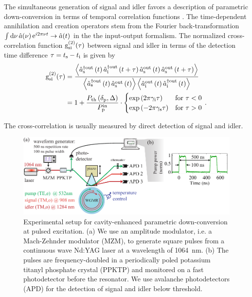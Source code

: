 \documentclass[aps,pra,showpacs,reprint,onecolumn,notitlepage]{revtex4-1}
\newcommand{\avr}[1]{\mathop{\left\langle #1 \right\rangle}\nolimits}
\newcommand{\tx}[1]{\textnormal{#1}}
\begin{document}
The simultaneous generation of signal and idler  favors a description of parametric down-conversion in terms of temporal correlation functions \cite{Fekete2013,glauber1963,Michael2013,Ou1999,Scholz2009,Bocquillon2009,Bettelli2010,Luo2015}. The time-dependent annihilation and creation operators stem from the Fourier back-transformation $\int \tx{d} \nu \, \hat{a}(\nu) \, \tx{e}^{i2 \pi \nu t} \rightarrow \hat{a}(t)$  in the the input-output formalism. The normalized cross-correlation function $\tx{g}^{(2)}_\textrm{si}(\tau)$  between signal and idler in terms of the detection time difference $\tau = t_\tx{s} - t_\tx{i}$ is given by
\begin{align}
	\tx{g}^{(2)}_\textrm{si}(\tau) &= \frac{ \avr{\hat{a}_\tx{s}^{\dagger \tx{out}} \left(t\right) \hat{a}_\tx{i}^{\dagger \tx{out}}\left(t+\tau\right) \hat{a}^{\tx{out}}_\tx{s} \left(t\right) \hat{a}^{\tx{out}}_\tx{s}\left(t+\tau\right)} }{\avr{\hat{a}^{\dagger \tx{out}}_\tx{s} \left(t\right) \hat{a}^{\tx{out}}_\tx{s} \left(t\right)} \avr{ \hat{a}^{\tx{out}}_\tx{i} \left(t\right) \hat{a}^{\dagger \tx{out}}_\tx{i}\left(t\right)} }  \notag \\
	&= 1 + \frac{ P_\textrm{th}\left( \delta_\textrm{p},\Delta \right) }{ P^\tx{in}_\textrm{p}  }  \cdot 
	\begin{cases}
        \tx{exp} \left(   2 \pi \gamma_\tx{i} \tau \right)  &\tx{for } \tau < 0  \\
        \tx{exp} \left( - 2 \pi \gamma_\tx{s} \tau \right) &\tx{for } \tau  > 0
        \end{cases}  \, .
	\label{eq:crosscorrelation}
\end{align}

The cross-correlation is usually measured by direct detection of signal and idler.

\begin{figure}[htb]
  \centering
  \includegraphics[scale=0.8]{pictures/exp_WGMR_detuning/WGMRsetup_pulsing4.pdf} 
\caption{Experimental setup for cavity-enhanced parametric down-conversion at pulsed excitation. (a) We use an amplitude modulator, i.e. a Mach-Zehnder modulator (MZM), to generate square pulses from a continuous wave Nd:YAG laser at a wavelength of \SI{1064}{\nm}. (b) The pulses are frequency-doubled in a periodically poled potassium titanyl phosphate crystal (PPKTP) and monitored on a fast photodetector before the resonator. We use avalanche photodetectors (APD) for the detection of signal and idler below threshold.}
\label{fig:pulsingsetup}
\end{figure}
\end{document}
